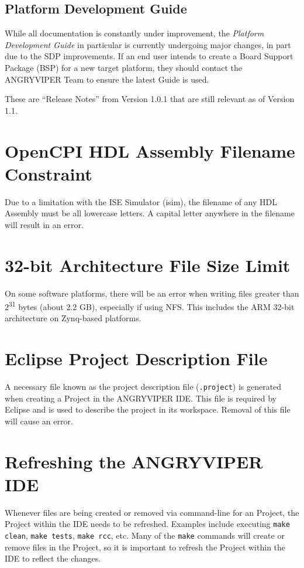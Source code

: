 \subsection{Platform Development Guide}
\label{bug:1585}
While all documentation is constantly under improvement, the \textit{Platform Development Guide} in particular is currently undergoing major changes, in part due to the SDP improvements. If an end user intends to create a Board Support Package (BSP) for a new target platform, they should contact the ANGRYVIPER Team to ensure the latest Guide is used.

\newpage
{}
\label{sec:101}
These are ``Release Notes'' from Version 1.0.1 that are still relevant as of Version 1.1.
\section{OpenCPI HDL Assembly Filename Constraint}
\label{bug:1035}
Due to a limitation with the ISE Simulator (isim), the filename of any HDL Assembly must be all lowercase letters. A capital letter anywhere in the filename will result in an error.

\section{32-bit Architecture File Size Limit}
\label{bug:693}
On some software platforms, there will be an error when writing files greater than 2\textsuperscript{31} bytes (about 2.2 GB), especially if using NFS. This includes the ARM 32-bit architecture on Zynq-based platforms.

\section{Eclipse Project Description File}
A necessary file known as the project description file (\verb+.project+) is generated when creating a Project in the ANGRYVIPER IDE. This file is required by Eclipse and is used to describe the project in its workspace. Removal of this file will cause an error.

\section{Refreshing the ANGRYVIPER IDE}
Whenever files are being created or removed via command-line for an Project, the Project within the IDE needs to be refreshed. Examples include executing \verb+make clean+, \verb+make tests+, \verb+make rcc+, etc. Many of the \verb+make+ commands will create or remove files in the Project, so it is important to refresh the Project within the IDE to reflect the changes.

